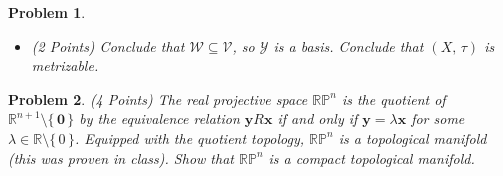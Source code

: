 \documentclass{article}
\theoremstyle{normal}
\newtheorem{problem}{Problem}
\begin{document}
\begin{problem}
\begin{itemize}
                We want to show $\mathcal{Y}$ is a basis for $\tau$.
                Given $x\in{X}$ and $\mathcal{V}\in\tau$ with $x\in\mathcal{V}$,
                since $\mathcal{X}$ is locally finite, there are only finitely
                many sets $\mathcal{U}_{0},\,\dots,\,\mathcal{U}_{n}$ in
                $\mathcal{X}$ that contain $x$. So
                $\mathcal{V}\cap\mathcal{U}_{k}$ is an open subset of
                $\mathcal{U}_{k}$ for all $k\in\mathbb{Z}_{n+1}$ that contains
                $x$, so there is an $\varepsilon_{k}>0$ such that
                $B_{\varepsilon_{k}}^{(\mathcal{U}_{k},\,d_{\mathcal{U}_{k}})}(x)\subseteq\mathcal{V}\cap\mathcal{U}_{k}$.
                Let $q\in\mathbb{Q}^{+}$ be less than
                $\textrm{min}\{\,\varepsilon_{k}\;|\;k\in\mathbb{Z}_{n+1}\,\}/2$.
                Since $\mathcal{Y}_{q}$ covers $X$ there is a set
                $\mathcal{W}\in\mathcal{Y}_{q}$ such that $x\in\mathcal{W}$.
                Since $\mathcal{Y}_{q}$ is a refinement of $\mathcal{A}_{q}$
                there is an open ball
                $B_{q}^{(\mathcal{U},\,d_{\mathcal{U}})}(x)\in\mathcal{A}_{q}$
                that contains $\mathcal{W}$. Show that $\mathcal{U}$ is actually
                one of the sets $\mathcal{U}_{0},\,\dots,\,\mathcal{U}_{n}$.
                [Hint: You just need to show that $x\in\mathcal{U}$ is true].
            \item (2 Points)
                Conclude that $\mathcal{W}\subseteq\mathcal{V}$, so
                $\mathcal{Y}$ is a basis. Conclude that $(X,\,\tau)$ is
                metrizable.
        \end{itemize}
    \end{problem}
    \begin{problem}
        (4 Points)
        The real projective space $\mathbb{RP}^{n}$ is the quotient of
        $\mathbb{R}^{n+1}\setminus\{\,\mathbf{0}\,\}$ by the equivalence
        relation $\mathbf{y}R\mathbf{x}$ if and only if
        $\mathbf{y}=\lambda\mathbf{x}$ for some
        $\lambda\in\mathbb{R}\setminus\{\,0\,\}$. Equipped with the quotient
        topology, $\mathbb{RP}^{n}$ is a topological manifold (this was proven
        in class). Show that $\mathbb{RP}^{n}$ is a compact
        topological manifold.
    \end{problem}
\end{document}

